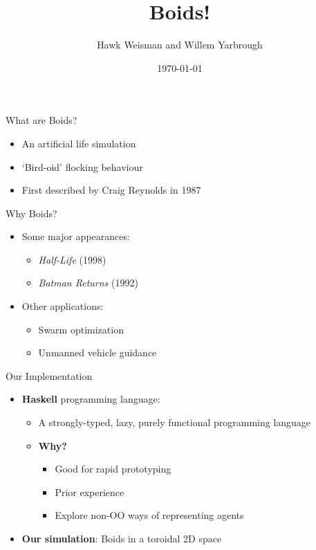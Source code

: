 \documentclass{beamer}
\title{\huge Boids!}
\author[Weisman and Yarbrough]{Hawk Weisman and Willem Yarbrough}
\institute[Allegheny College]{Department of Computer Science \\ Allegheny College}
\date{\today}
\begin{document}
\begin{frame}
  \titlepage
\end{frame}

\begin{frame}
    \huge{What are Boids?}\normalsize
    \begin{itemize}
        \item An artificial life simulation~\cite{hartman2006autonomous,reynolds1987flocks}
        \item `Bird-oid' flocking behaviour~\cite{hartman2006autonomous,reynolds1987flocks}
        \item First described by Craig Reynolds in 1987~\cite{reynolds1987flocks}
    \end{itemize}
\end{frame}

\begin{frame}
    \huge{Why Boids?}\normalsize
    \begin{itemize}
        \item Some major appearances:
        \begin{itemize}
            \item \textit{Half-Life} (1998)
            \item \textit{Batman Returns} (1992)
        \end{itemize}
        \item Other applications:
        \begin{itemize}
            \item Swarm optimization
            \item Unmanned vehicle guidance
        \end{itemize}
    \end{itemize}
\end{frame}

\begin{frame}
\huge{Our Implementation}\normalsize
\begin{itemize}
    \item \textbf{Haskell} programming language:
    \begin{itemize}
        \item A strongly-typed, lazy, purely functional programming language
        \item \textbf{Why?}
        \begin{itemize}
            \item Good for rapid prototyping~\cite{hudak1994haskell}
            \item Prior experience
            \item Explore non-OO ways of representing agents
        \end{itemize}
    \end{itemize}
    \item \textbf{Our simulation}: Boids in a toroidal 2D space
\end{itemize}

\end{frame}
\end{document}
